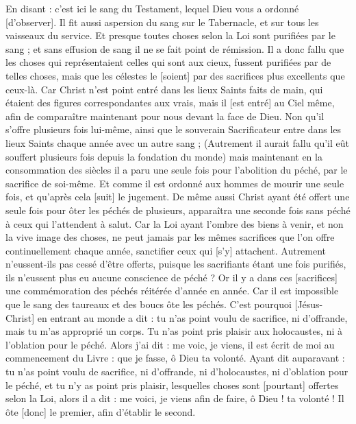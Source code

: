 \begin{multicols}{2}
En disant : c'est ici le sang du Testament, lequel Dieu vous a ordonné [d'observer].
Il fit aussi aspersion du sang sur le Tabernacle, et sur tous les vaisseaux du service.
Et presque toutes choses selon la Loi sont purifiées par le sang ; et sans effusion de sang il ne se fait point de rémission.
Il a donc fallu que les choses qui représentaient celles qui sont aux cieux, fussent purifiées par de telles choses, mais que les célestes le [soient] par des sacrifices plus excellents que ceux-là.
Car Christ n'est point entré dans les lieux Saints faits de main, qui étaient des figures correspondantes aux vrais, mais il [est entré] au Ciel même, afin de comparaître maintenant pour nous devant la face de Dieu.
Non qu'il s'offre plusieurs fois lui-même, ainsi que le souverain Sacrificateur entre dans les lieux Saints chaque année avec un autre sang ;
(Autrement il aurait fallu qu'il eût souffert plusieurs fois depuis la fondation du monde) mais maintenant en la consommation des siècles il a paru une seule fois pour l'abolition du péché, par le sacrifice de soi-même.
Et comme il est ordonné aux hommes de mourir une seule fois, et qu'après cela [suit] le jugement.
De même aussi Christ ayant été offert une seule fois pour ôter les péchés de plusieurs, apparaîtra une seconde fois sans péché à ceux qui l'attendent à salut.
\VerseOne{}Car la Loi ayant l'ombre des biens à venir, et non la vive image des choses, ne peut jamais par les mêmes sacrifices que l'on offre continuellement chaque année, sanctifier ceux qui [s'y] attachent.
Autrement n'eussent-ils pas cessé d'être offerts, puisque les sacrifiants étant une fois purifiés, ils n'eussent plus eu aucune conscience de péché ?
Or il y a dans ces [sacrifices] une commémoration des péchés réitérée d'année en année.
Car il est impossible que le sang des taureaux et des boucs ôte les péchés.
C'est pourquoi [Jésus-Christ] en entrant au monde a dit : tu n'as point voulu de sacrifice, ni d'offrande, mais tu m'as approprié un corps.
Tu n'as point pris plaisir aux holocaustes, ni à l'oblation pour le péché.
Alors j'ai dit : me voic, je viens, il est écrit de moi au commencement du Livre : que je fasse, ô Dieu ta volonté.
Ayant dit auparavant : tu n'as point voulu de sacrifice, ni d'offrande, ni d'holocaustes, ni d'oblation pour le péché, et tu n'y as point pris plaisir, lesquelles choses sont [pourtant] offertes selon la Loi, alors il a dit : me voici, je viens afin de faire, ô Dieu ! ta volonté !
Il ôte [donc] le premier, afin d'établir le second.

\end{multicols}
